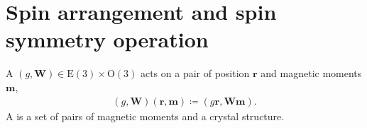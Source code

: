 \section{Spin arrangement and spin symmetry operation}

A  $(g, \bm{W}) \in \mathrm{E}(3) \times \mathrm{O}(3)$ acts on a pair of position $\bm{r}$ and magnetic moments $\bm{m}$,
\begin{align}
  (g, \bm{W}) (\bm{r}, \bm{m}) \coloneqq (g \bm{r}, \bm{Wm}).
\end{align}
A  is a set of pairs of magnetic moments and a crystal structure.
